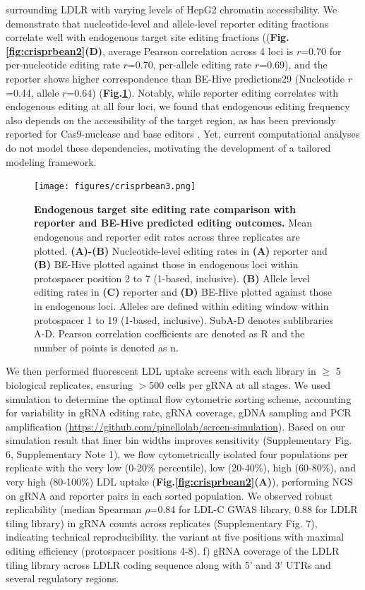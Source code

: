 \documentclass[a4paper, titlepage, openright]{book}
\begin{document}
surrounding LDLR with varying levels of HepG2 chromatin accessibility. We demonstrate that nucleotide-level and allele-level reporter editing fractions correlate well with endogenous target site editing fractions ((\textbf{Fig.\ref{fig:crisprbean2}(D)}, average Pearson correlation across 4 loci is $r$=0.70 for per-nucleotide editing rate $r$=0.70, per-allele editing rate $r$=0.69), and the reporter shows higher correspondence than BE-Hive predictions29 (Nucleotide $r$=0.44, allele $r$=0.64) (\textbf{Fig.\ref{fig:crisprbean3}}). Notably, while reporter editing correlates with endogenous editing at all four loci, we found that endogenous editing frequency also depends on the accessibility of the target region, as has been previously reported for Cas9-nuclease \citep{schep2021impact, ding2019improving, liu2019modulating} and base editors \citep{shin2021small, yang2023hmgn1}. Yet, current computational analyses do not model these dependencies, motivating the development of a tailored modeling framework.
\begin{figure}
	\centering
	\texttt{[image: figures/crisprbean3.png]}
	\caption[Endogenous target site editing rate comparison with reporter and BE-Hive predicted editing outcomes]{\textbf{Endogenous target site editing rate comparison with reporter and BE-Hive predicted editing outcomes. } Mean endogenous and reporter edit rates across three replicates are plotted. \textbf{(A)-(B)} Nucleotide-level editing rates in \textbf{(A)} reporter and \textbf{(B)} BE-Hive plotted against those in endogenous loci within protospacer position 2 to 7 (1-based, inclusive). \textbf{(B)} Allele level editing rates in \textbf{(C)} reporter and \textbf{(D)} BE-Hive plotted against those in endogenous loci. Alleles are defined within editing window within protospacer 1 to 19 (1-based, inclusive). SubA-D denotes sublibraries A-D. Pearson correlation coefficients are denoted as R and the number of points is denoted as n.}
	\label{fig:crisprbean3}
\end{figure} 
We then performed fluorescent LDL uptake screens with each library in $\geq$ 5 biological replicates, ensuring $>$500 cells per gRNA at all stages. We used simulation to determine the optimal flow cytometric sorting scheme, accounting for variability in gRNA editing rate, gRNA coverage, gDNA sampling and PCR amplification (\url{https://github.com/pinellolab/screen-simulation}). Based on our simulation result that finer bin widths improves sensitivity (Supplementary Fig. 6, Supplementary Note 1), we flow cytometrically isolated four populations per replicate with the very low (0-20\% percentile), low (20-40\%), high (60-80\%), and very high (80-100\%) LDL uptake (\textbf{Fig.\ref{fig:crisprbean2}(A)}), performing NGS on gRNA and reporter pairs in each sorted population. We observed robust replicability (median Spearman $\rho$=0.84 for LDL-C GWAS library, 0.88 for LDLR tiling library) in gRNA counts across replicates (Supplementary Fig. 7), indicating technical reproducibility.  the variant at five positions with maximal editing efficiency (protospacer positions 4-8). f) gRNA coverage of the LDLR tiling library across LDLR coding sequence along with 5’ and 3’ UTRs and several regulatory regions. 
\end{document}
